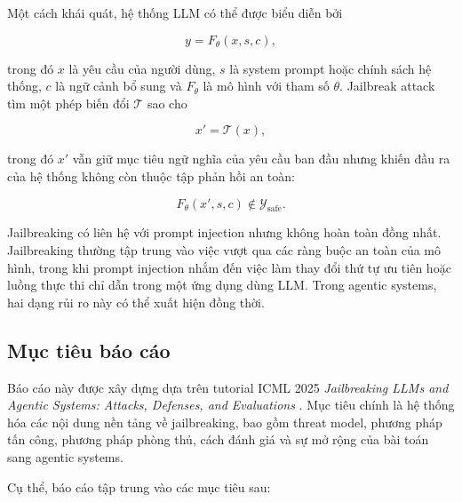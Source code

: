 Một cách khái quát, hệ thống LLM có thể được biểu diễn bởi

\begin{equation}
    y = F_{\theta}(x, s, c),
    \label{eq:aligned-llm-output}
\end{equation}

trong đó $x$ là yêu cầu của người dùng, $s$ là system prompt hoặc chính
sách hệ thống, $c$ là ngữ cảnh bổ sung và $F_{\theta}$ là mô hình với tham
số $\theta$. Jailbreak attack tìm một phép biến đổi $\mathcal{T}$ sao cho

\begin{equation}
    x' = \mathcal{T}(x),
    \label{eq:jailbreak-transformation}
\end{equation}

trong đó $x'$ vẫn giữ mục tiêu ngữ nghĩa của yêu cầu ban đầu nhưng khiến
đầu ra của hệ thống không còn thuộc tập phản hồi an toàn:

\begin{equation}
    F_{\theta}(x', s, c)
    \notin
    \mathcal{Y}_{\mathrm{safe}}.
    \label{eq:jailbreak-objective}
\end{equation}

Jailbreaking có liên hệ với prompt injection nhưng không hoàn toàn đồng
nhất. Jailbreaking thường tập trung vào việc vượt qua các ràng buộc an
toàn của mô hình, trong khi prompt injection nhắm đến việc làm thay đổi
thứ tự ưu tiên hoặc luồng thực thi chỉ dẫn trong một ứng dụng dùng LLM.
Trong agentic systems, hai dạng rủi ro này có thể xuất hiện đồng thời.

\subsection{Mục tiêu báo cáo}
\label{subsec:objectives}

Báo cáo này được xây dựng dựa trên tutorial ICML 2025
\textit{Jailbreaking LLMs and Agentic Systems: Attacks, Defenses, and
Evaluations} \cite{jailbreak_tutorial_2025}. Mục tiêu chính là hệ thống hóa
các nội dung nền tảng về jailbreaking, bao gồm threat model, phương pháp
tấn công, phương pháp phòng thủ, cách đánh giá và sự mở rộng của bài toán
sang agentic systems.

Cụ thể, báo cáo tập trung vào các mục tiêu sau:

